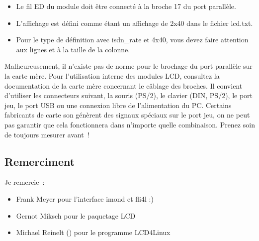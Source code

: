   \begin{itemize}
  \item Le fil ED du module doit être connecté à la broche 17 du port parallèle.
  
  \item L'affichage est défini comme étant un affichage de 2x40 dans le fichier lcd.txt.
  
  \item Pour le type de définition avec isdn\_rate et 4x40, vous devez faire attention
	aux lignes et à la taille de la colonne.
  \end{itemize}

  Malheureusement, il n'existe pas de norme pour le brochage du port parallèle sur
  la carte mère. Pour l'utilisation interne des modules LCD, consultez la documentation
  de la carte mère concernant le câblage des broches. Il convient d'utiliser les
  connecteurs suivant, la souris (PS/2), le clavier (DIN, PS/2), le port jeu, le port
  USB ou une connexion libre de l'alimentation du PC. Certains fabricants de carte son
  génèrent des signaux spéciaux sur le port jeu, on ne peut pas garantir que cela
  fonctionnera dans n'importe quelle combinaison. Prenez soin de toujours mesurer avant~!

\subsection{Remerciment}

  Je remercie~:

  \begin{itemize}
  \item Frank Meyer pour l'interface imond et fli4l :)
   
  \item Gernot Miksch pour le paquetage LCD
   
  \item Michael Reinelt () pour
        le programme LCD4Linux
  \end{itemize}
